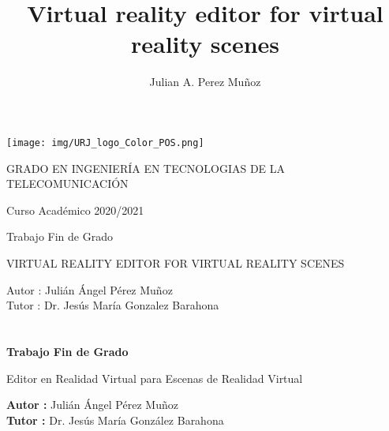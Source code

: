 \documentclass[a4paper, 12pt]{book}
\title{Virtual reality editor for virtual reality scenes}
\author{Julian A. Perez Muñoz}
\begin{document}
\renewcommand{\refname}{Bibliografía}  %
\renewcommand{\appendixname}{Apéndice}


\begin{titlepage}
\begin{center}
\texttt{[image: img/URJ\_logo\_Color\_POS.png]}

\vspace{1.75cm}

\Large
GRADO EN INGENIERÍA EN TECNOLOGIAS DE LA TELECOMUNICACIÓN

\vspace{0.4cm}

\large
Curso Académico 2020/2021

\vspace{0.8cm}

Trabajo Fin de Grado

\vspace{2.5cm}

\LARGE
VIRTUAL REALITY EDITOR FOR VIRTUAL REALITY SCENES

\vspace{4cm}

\large
Autor : Julián Ángel Pérez Muñoz\\
Tutor : Dr. Jesús María Gonzalez Barahona
\end{center}
\end{titlepage}

\newpage
\mbox{}
\thispagestyle{empty} %


\clearpage
{}
\chapter*{}

\vspace{-4cm}
\begin{center}
\LARGE
\textbf{Trabajo Fin de Grado}

\vspace{1cm}
\large
Editor en Realidad Virtual para Escenas de Realidad Virtual

\vspace{1cm}
\large
\textbf{Autor :} Julián Ángel Pérez Muñoz\\
\textbf{Tutor :} Dr. Jesús María González Barahona

\end{center}
\end{document}
